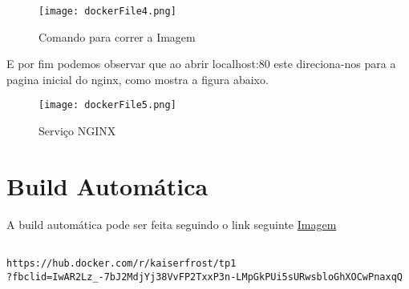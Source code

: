\begin{figure}[H]

	\centering
	\texttt{[image: dockerFile4.png]}

 	\caption {Comando para correr a Imagem}

  	\label {fig:DocCom4}
\end{figure}

E por fim podemos observar que ao abrir localhost:80 este direciona-nos para a pagina inicial do nginx, como mostra a figura abaixo.

\begin{figure}[H]

	\centering
	\texttt{[image: dockerFile5.png]}

 	\caption {Serviço NGINX}

  	\label {fig:DocCom5}
\end{figure}



\section{Build Automática}

A build automática pode ser feita seguindo o link seguinte \href{https://hub.docker.com/r/kaiserfrost/tp1?fbclid=IwAR2Lz_-7bJ2MdjYj38VvFP2TxxP3n-LMpGkPUi5sURwsbloGhXOCwPnaxqQ}{Imagem}

\begin{lstlisting}

https://hub.docker.com/r/kaiserfrost/tp1
?fbclid=IwAR2Lz_-7bJ2MdjYj38VvFP2TxxP3n-LMpGkPUi5sURwsbloGhXOCwPnaxqQ

\end{lstlisting}

